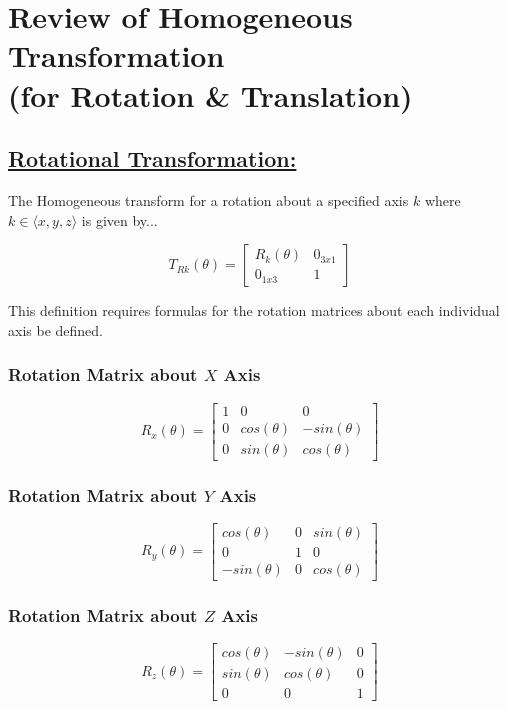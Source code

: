 \documentclass[12px]{article}
\begin{document}
\section*{Review of Homogeneous Transformation \\ (for Rotation \& Translation)}

\subsection*{\underline{Rotational Transformation:}}

The Homogeneous transform for a rotation about a specified axis $k$ where $k \in \langle x, y, z\rangle$  is given by...

$$
T_{Rk}(\theta) =
\begin{bmatrix}
    R_k(\theta) & 0_{3x1} \\
    0_{1x3} & 1
\end{bmatrix}
$$

\noindent This definition requires formulas for the rotation matrices about each individual axis be defined.

\subsubsection*{Rotation Matrix about $X$ Axis}

$$
R_x(\theta) =
\begin{bmatrix}
     1 & 0 & 0 \\
     0 & cos(\theta) & -sin(\theta) \\
     0 & sin(\theta) & cos(\theta)
\end{bmatrix}
$$

\subsubsection*{Rotation Matrix about $Y$ Axis}

$$
R_y(\theta) =
\begin{bmatrix}
     cos(\theta) & 0 & sin(\theta) \\
     0 & 1 & 0 \\
     -sin(\theta) & 0 & cos(\theta)
\end{bmatrix}
$$

\subsubsection*{Rotation Matrix about $Z$ Axis}

$$
R_z(\theta) =
\begin{bmatrix}
    cos(\theta) & -sin(\theta) & 0\\
    sin(\theta) & cos(\theta) & 0 \\
    0 & 0 & 1
\end{bmatrix}
$$
\end{document}
